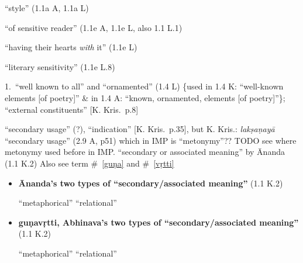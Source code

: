 \documentclass[10pt]{article}
\begin{document}
\begin{multicols}{2}
\begin{enumerate}
		 ``style'' (1.1a A, 1.1a L)

		 ``of sensitive reader'' (1.1e A, 1.1e L, also 1.1 L.1)

		 ``having their hearts \textit{with} it'' (1.1e L)

		 ``literary sensitivity'' (1.1e L.8)


		 1.\ ``well known to all'' and ``ornamented'' (1.4 L) \{used in 1.4 K: ``well-known elements [of poetry]'' \& in 1.4 A: ``known, ornamented, elements [of poetry]''\};
		``external constituents'' [K. Kris.\ p.8]

		 ``secondary usage'' (?), ``indication'' [K. Kris.\ p.35],
		but K. Kris.: \textit{lakṣaṇayā} ``secondary usage'' (2.9 A, p51) which in IMP is ``metonymy''??
		TODO see where metonymy used before in IMP.
		``secondary or associated meaning'' by Ānanda (1.1 K.2)
		Also see term \#~\ref{guṇa} and \#~\ref{vṛtti}


		\begin{itemize}
			\item \textbf{Ānanda's two types of ``secondary\-/associated meaning''} (1.1 K.2)
			      \begin{enumerate}
				       ``metaphorical''
				       ``relational''
			      \end{enumerate}

			\item \textbf{guṇavṛtti, Abhinava's two types of ``secondary/associated meaning''} (1.1 K.2)
			      \begin{enumerate}
				       ``metaphorical''
				       ``relational''
			      \end{enumerate}
		\end{itemize}


\end{enumerate}
\end{multicols}
\end{document}
